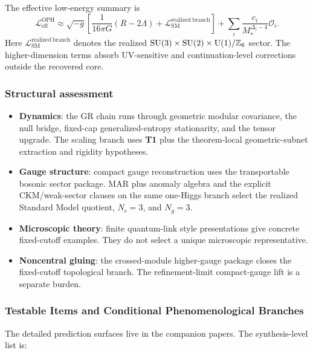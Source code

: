 The effective low-energy summary is
\[
\mathcal L_{\mathrm{eff}}^{\mathrm{OPH}}
\approx
\sqrt{-g}\left[
\frac{1}{16\pi G}(R-2\Lambda)
+
\mathcal L_{\mathrm{SM}}^{\mathrm{realized\ branch}}
\right]
+
\sum_i \frac{c_i}{M_*^{\Delta_i-4}}\mathcal O_i.
\]
Here \(\mathcal L_{\mathrm{SM}}^{\mathrm{realized\ branch}}\) denotes the realized
\(\mathrm{SU}(3)\times\mathrm{SU}(2)\times\mathrm{U}(1)/\mathbb Z_6\) sector. The higher-dimension terms absorb
UV-sensitive and continuation-level corrections outside the recovered core.
\subsubsection{Structural assessment}\label{82-structural-assessment}

\begin{itemize}
\tightlist
\item \textbf{Dynamics}: the GR chain runs through geometric modular covariance, the null bridge,
fixed-cap generalized-entropy stationarity, and the tensor upgrade. The scaling branch uses
\textbf{T1} plus the theorem-local geometric-subnet extraction and rigidity hypotheses.
\item \textbf{Gauge structure}: compact gauge reconstruction uses the transportable bosonic
sector package. MAR plus anomaly algebra and the explicit CKM/weak-sector clauses on the same
one-Higgs branch select the realized Standard Model quotient, \(N_c=3\), and \(N_g=3\).
\item \textbf{Microscopic theory}: finite quantum-link style presentations give concrete
fixed-cutoff examples. They do not select a unique microscopic representative.
\item \textbf{Noncentral gluing}: the crossed-module higher-gauge package closes the fixed-cutoff
topological branch. The refinement-limit compact-gauge lift is a separate burden.
\end{itemize}

\subsubsection{Testable Items and Conditional Phenomenological Branches}\label{83-novel-testable-predictions}

The detailed prediction surfaces live in the companion papers. The synthesis-level list is:

